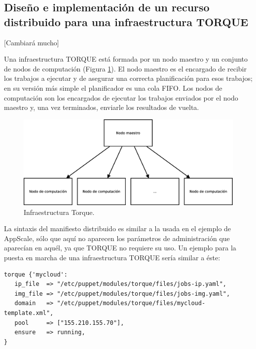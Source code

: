 \subsection{Diseño e implementación de un recurso distribuido para una infraestructura TORQUE}

[Cambiará mucho]

Una infraestructura TORQUE está formada por un nodo maestro y un conjunto de nodos de computación (Figura \ref{figure:arquitectura-torque}). El nodo maestro es el encargado de recibir los trabajos a ejecutar y de asegurar una correcta planificación para esos trabajos; en su versión más simple el planificador es una cola FIFO. Los nodos de computación son los encargados de ejecutar los trabajos enviados por el nodo maestro y, una vez terminados, enviarle los resultados de vuelta.

\begin{figure} [!htbp]
  \centering
  \includegraphics[width=13.5cm]{figuras/Arquitectura_Torque.eps}
  \caption{Infraestructura Torque.}
\label{figure:arquitectura-torque}
\end{figure}


La sintaxis del manifiesto distribuido es similar a la usada en el ejemplo de AppScale, sólo que aquí no aparecen los parámetros de administración que aparecían en aquél, ya que TORQUE no requiere su uso. Un ejemplo para la puesta en marcha de una infraestructura TORQUE sería similar a éste:

\begin{lstlisting}
torque {'mycloud':
   ip_file  => "/etc/puppet/modules/torque/files/jobs-ip.yaml",
   img_file => "/etc/puppet/modules/torque/files/jobs-img.yaml",
   domain   => "/etc/puppet/modules/torque/files/mycloud-template.xml",
   pool     => ["155.210.155.70"],
   ensure   => running,
}
\end{lstlisting}

